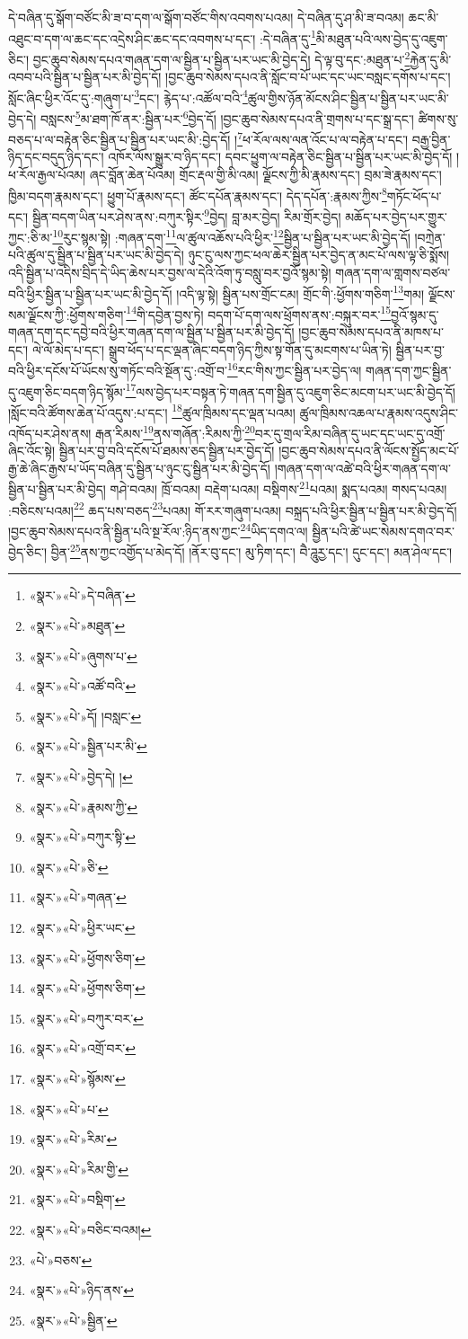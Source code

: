 དེ་བཞིན་དུ་སྒོག་བཙོང་མི་ཟ་བ་དག་ལ་སྒོག་བཙོང་གིས་འབགས་པའམ། དེ་བཞིན་དུ་ཤ་མི་ཟ་བའམ། ཆང་མི་འཐུང་བ་དག་ལ་ཆང་དང་འདྲེས་ཤིང་ཆང་དང་འབགས་པ་དང་། :དེ་བཞིན་དུ་\footnote{«སྣར་»«པེ་»དེ་བཞིན་}མི་མཐུན་པའི་ལས་བྱེད་དུ་འཇུག་ཅིང་། བྱང་ཆུབ་སེམས་དཔའ་གཞན་དག་ལ་སྦྱིན་པ་སྦྱིན་པར་ཡང་མི་བྱེད་དེ། དེ་ལྟ་བུ་དང་:མཐུན་པ་\footnote{«སྣར་»«པེ་»མཐུན་}རྐྱེན་དུ་མི་འབབ་པའི་སྦྱིན་པ་སྦྱིན་པར་མི་བྱེད་དོ། །བྱང་ཆུབ་སེམས་དཔའ་ནི་སློང་བ་པོ་ཡང་དང་ཡང་བསླང་དགོས་པ་དང་། སློང་ཞིང་ཕྱིར་འོང་དུ་:གཞུག་པ་\footnote{«སྣར་»«པེ་»ཞུགས་པ་}དང་། རྙེད་པ་:འཚོལ་བའི་\footnote{«སྣར་»«པེ་»འཚོ་བའི་}ཚུལ་གྱིས་ཉོན་མོངས་ཤིང་སྦྱིན་པ་སྦྱིན་པར་ཡང་མི་བྱེད་དེ། བསླངས་\footnote{«སྣར་»«པེ་»དོ། །བསླང་}མ་ཐག་ཁོ་ནར་:སྦྱིན་པར་\footnote{«སྣར་»«པེ་»སྦྱིན་པར་མི་}བྱེད་དོ། །བྱང་ཆུབ་སེམས་དཔའ་ནི་གྲགས་པ་དང་སྒྲ་དང་། ཚིགས་སུ་བཅད་པ་ལ་བརྟེན་ཅིང་སྦྱིན་པ་སྦྱིན་པར་ཡང་མི་:བྱེད་དོ། །\footnote{«སྣར་»«པེ་»བྱེད་དེ། །}ཕ་རོལ་ལས་ལན་འོང་པ་ལ་བརྟེན་པ་དང་། བརྒྱ་བྱིན་ཉིད་དང་བདུད་ཉིད་དང་། འཁོར་ལོས་སྒྱུར་བ་ཉིད་དང་། དབང་ཕྱུག་ལ་བརྟེན་ཅིང་སྦྱིན་པ་སྦྱིན་པར་ཡང་མི་བྱེད་དོ། །ཕ་རོལ་རྒྱལ་པོའམ། ཞང་བློན་ཆེན་པོའམ། གྲོང་རྡལ་གྱི་མི་འམ། ལྗོངས་ཀྱི་མི་རྣམས་དང་། བྲམ་ཟེ་རྣམས་དང་། ཁྱིམ་བདག་རྣམས་དང་། ཕྱུག་པོ་རྣམས་དང་། ཚོང་དཔོན་རྣམས་དང་། དེད་དཔོན་:རྣམས་ཀྱིས་\footnote{«སྣར་»«པེ་»རྣམས་ཀྱི་}གཏོང་ཕོད་པ་དང་། སྦྱིན་བདག་ཡིན་པར་ཤེས་ནས་:བཀུར་སྟིར་\footnote{«སྣར་»«པེ་»བཀུར་སྟི་}བྱེད། བླ་མར་བྱེད། རིམ་གྲོར་བྱེད། མཆོད་པར་བྱེད་པར་གྱུར་ཀྱང་:ཅི་མ་\footnote{«སྣར་»«པེ་»ཅི་}རུང་སྙམ་སྟེ། :གཞན་དག་\footnote{«སྣར་»«པེ་»གཞན་}ལ་ཚུལ་འཆོས་པའི་ཕྱིར་\footnote{«སྣར་»«པེ་»ཕྱིར་ཡང་}སྦྱིན་པ་སྦྱིན་པར་ཡང་མི་བྱེད་དོ། །བཀྲེན་པའི་ཚུལ་དུ་སྦྱིན་པ་སྦྱིན་པར་ཡང་མི་བྱེད་དེ། ཉུང་ངུ་ལས་ཀྱང་ཕལ་ཆེར་སྦྱིན་པར་བྱེད་ན་མང་པོ་ལས་ལྟ་ཅི་སྨོས། འདི་སྦྱིན་པ་འདིས་བྲིད་དེ་ཡིད་ཆེས་པར་བྱས་ལ་དེའི་འོག་ཏུ་བསླུ་བར་བྱའོ་སྙམ་སྟེ། གཞན་དག་ལ་གླགས་བཙལ་བའི་ཕྱིར་སྦྱིན་པ་སྦྱིན་པར་ཡང་མི་བྱེད་དོ། །འདི་ལྟ་སྟེ། སྦྱིན་པས་གྲོང་ངམ། གྲོང་གི་:ཕྱོགས་གཅིག་\footnote{«སྣར་»«པེ་»ཕྱོགས་ཅིག་}གམ། ལྗོངས་སམ་ལྗོངས་ཀྱི་:ཕྱོགས་གཅིག་\footnote{«སྣར་»«པེ་»ཕྱོགས་ཅིག་}གི་དབྱེན་བྱས་ཏེ། བདག་པོ་དག་ལས་ཕྲོགས་ནས་:བསྐུར་བར་\footnote{«སྣར་»«པེ་»བཀུར་བར་}བྱའོ་སྙམ་དུ་གཞན་དག་དང་དབྱེ་བའི་ཕྱིར་གཞན་དག་ལ་སྦྱིན་པ་སྦྱིན་པར་མི་བྱེད་དོ། །བྱང་ཆུབ་སེམས་དཔའ་ནི་མཁས་པ་དང་། ལེ་ལོ་མེད་པ་དང་། སྒྲུབ་ཕོད་པ་དང་ལྡན་ཞིང་བདག་ཉིད་ཀྱིས་སྟ་གོན་དུ་མངགས་པ་ཡིན་ཏེ། སྦྱིན་པར་བྱ་བའི་ཕྱིར་དངོས་པོ་ཡོངས་སུ་གཏོང་བའི་སྔོན་དུ་:འགྲོ་བ་\footnote{«སྣར་»«པེ་»འགྲོ་བར་}རང་གིས་ཀྱང་སྦྱིན་པར་བྱེད་ལ། གཞན་དག་ཀྱང་སྦྱིན་དུ་འཇུག་ཅིང་བདག་ཉིད་སྙོམ་\footnote{«སྣར་»«པེ་»སྙོམས་}ལས་བྱེད་པར་བསྟན་ཏེ་གཞན་དག་སྦྱིན་དུ་འཇུག་ཅིང་མངག་པར་ཡང་མི་བྱེད་དོ། །སློང་བའི་ཚོགས་ཆེན་པོ་འདུས་:པ་དང་། \footnote{«སྣར་»«པེ་»པ་}ཚུལ་ཁྲིམས་དང་ལྡན་པའམ། ཚུལ་ཁྲིམས་འཆལ་པ་རྣམས་འདུས་ཤིང་འཁོད་པར་ཤེས་ནས། རྒན་རིམས་\footnote{«སྣར་»«པེ་»རིམ་}ནས་གཞོན་:རིམས་ཀྱི་\footnote{«སྣར་»«པེ་»རིམ་གྱི་}བར་དུ་གྲལ་རིམ་བཞིན་དུ་ཡང་དང་ཡང་དུ་འགྲོ་ཞིང་འོང་སྟེ། སྦྱིན་པར་བྱ་བའི་དངོས་པོ་ཐམས་ཅད་སྦྱིན་པར་བྱེད་དོ། །བྱང་ཆུབ་སེམས་དཔའ་ནི་ལོངས་སྤྱོད་མང་པོ་རྒྱ་ཆེ་ཞིང་རྒྱས་པ་ཡོད་བཞིན་དུ་སྦྱིན་པ་ཉུང་ངུ་སྦྱིན་པར་མི་བྱེད་དོ། །གཞན་དག་ལ་འཚེ་བའི་ཕྱིར་གཞན་དག་ལ་སྦྱིན་པ་སྦྱིན་པར་མི་བྱེད། གཤེ་བའམ། ཁྲོ་བའམ། བརྡེག་པའམ། བསྡིགས་\footnote{«སྣར་»«པེ་»བསྡིག་}པའམ། སྨད་པའམ། གསད་པའམ། :བཅིངས་པའམ།\footnote{«སྣར་»«པེ་»བཅིང་བའམ།} ཆད་པས་བཅད་\footnote{«པེ་»བཅས་}པའམ། གོ་རར་གཞུག་པའམ། བསྐྲད་པའི་ཕྱིར་སྦྱིན་པ་སྦྱིན་པར་མི་བྱེད་དོ། །བྱང་ཆུབ་སེམས་དཔའ་ནི་སྦྱིན་པའི་སྔ་རོལ་:ཉིད་ནས་ཀྱང་\footnote{«སྣར་»«པེ་»ཉིད་ནས་}ཡིད་དགའ་ལ། སྦྱིན་པའི་ཚེ་ཡང་སེམས་དགའ་བར་བྱེད་ཅིང་། བྱིན་\footnote{«སྣར་»«པེ་»སྦྱིན་}ནས་ཀྱང་འགྱོད་པ་མེད་དོ། །ནོར་བུ་དང་། མུ་ཏིག་དང་། བཻ་ཌཱུརྱ་དང་། དུང་དང་། མན་ཤེལ་དང་། 